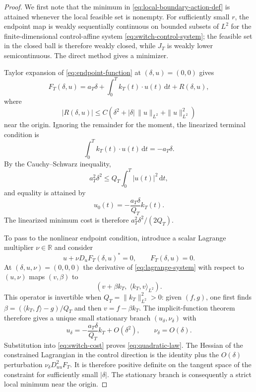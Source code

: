\documentclass[11pt]{article}
\theoremstyle{definition}
\theoremstyle{remark}
\newcommand{\R}{\mathbb{R}}
\newcommand{\dd}{\mathrm{d}}
\begin{document}
\begin{proof}
We first note that the minimum in \eqref{eq:local-boundary-action-def} is attained whenever the local feasible set is nonempty.  For sufficiently small $r$, the endpoint map is weakly sequentially continuous on bounded subsets of $L^2$ for the finite-dimensional control-affine system \eqref{eq:switch-control-system}; the feasible set in the closed ball is therefore weakly closed, while $J_T$ is weakly lower semicontinuous.  The direct method gives a minimizer.

Taylor expansion of \eqref{eq:endpoint-function} at $(\delta,u)=(0,0)$ gives
\begin{equation}
F_T(\delta,u)
=a_T\delta+\int_0^T k_T(t)\cdot u(t)\,\dd t
+R(\delta,u),
\label{eq:endpoint-expansion}
\end{equation}
where
\begin{equation}
|R(\delta,u)|
\le C\left(\delta^2+|\delta|\,\|u\|_{L^2}+\|u\|_{L^2}^2\right)
\end{equation}
near the origin.  Ignoring the remainder for the moment, the linearized terminal condition is
\begin{equation}
\int_0^T k_T(t)\cdot u(t)\,\dd t=-a_T\delta.
\label{eq:linear-terminal-condition}
\end{equation}
By the Cauchy--Schwarz inequality,
\begin{equation}
a_T^2\delta^2
\le Q_T\int_0^T |u(t)|^2\,\dd t,
\end{equation}
and equality is attained by
\begin{equation}
u_0(t)=-\frac{a_T\delta}{Q_T}k_T(t).
\end{equation}
The linearized minimum cost is therefore $a_T^2\delta^2/(2Q_T)$.

To pass to the nonlinear endpoint condition, introduce a scalar Lagrange multiplier $\nu\in\R$ and consider
\begin{equation}
u+\nu D_uF_T(\delta,u)^*=0,
\qquad
F_T(\delta,u)=0.
\label{eq:lagrange-system}
\end{equation}
At $(\delta,u,\nu)=(0,0,0)$ the derivative of \eqref{eq:lagrange-system} with respect to $(u,\nu)$ maps $(v,\beta)$ to
\begin{equation}
\left(v+\beta k_T,\;\langle k_T,v\rangle_{L^2}\right).
\end{equation}
This operator is invertible when $Q_T=\|k_T\|_{L^2}^2>0$: given $(f,g)$, one first finds $\beta=(\langle k_T,f\rangle-g)/Q_T$ and then $v=f-\beta k_T$.  The implicit-function theorem therefore gives a unique small stationary branch $(u_\delta,\nu_\delta)$ with
\begin{equation}
u_\delta
=-\frac{a_T\delta}{Q_T}k_T+O(\delta^2),
\qquad
\nu_\delta=O(\delta).
\end{equation}
Substitution into \eqref{eq:switch-cost} proves \eqref{eq:quadratic-law}.  The Hessian of the constrained Lagrangian in the control direction is the identity plus the $O(\delta)$ perturbation $\nu_\delta D_{uu}^2F_T$.  It is therefore positive definite on the tangent space of the constraint for sufficiently small $|\delta|$.  The stationary branch is consequently a strict local minimum near the origin.


\end{proof}
\end{document}
